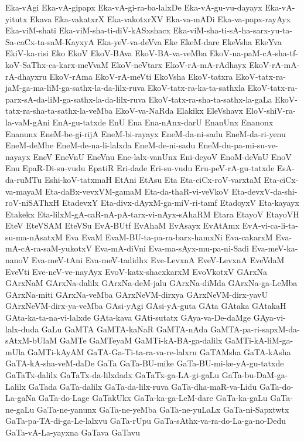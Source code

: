 {Eka-vAgi
Eka-vA-gipapx
Eka-vA-gi-ra-ba-lalxDe
Eka-vA-gu-vu-dayayx
Eka-vA-yitutx
Ekava
Eka-vakatxrX
Eka-vakotxrXV
Eka-va-mADi
Eka-va-papx-rayAyx
Eka-viM-shati
Eka-viM-sha-ti-diV-kASxshacx
Eka-viM-sha-ti-sA-ha-sarx-yu-ta-Sa-caCx-ta-saM-KayxyA
Eka-yeV-va-deVva
Eke
EkeM-dare
EkeVsha
EkeYva
EkiV-ka-risi
Eko
EkoV
EkoV-BAva
EkoV-BA-va-veMba
EkoV-na-paM-cA-sha-tf-koV-SaThx-ca-karx-meVvaM
EkoV-neVtarx
EkoV-rA-mA-rAdhayx
EkoV-rA-mA-rA-dhayxru
EkoV-rAma
EkoV-rA-meVti
EkoVsha
EkoV-tatxra
EkoV-tatx-ra-jaM-ga-ma-liM-ga-sathx-la-da-lilx-ruva
EkoV-tatx-ra-ka-ta-sathxla
EkoV-tatx-ra-parx-sA-da-liM-ga-sathx-la-da-lilx-ruva
EkoV-tatx-ra-sha-ta-sathx-la-gaLa
EkoV-tatx-ra-sha-ta-sathx-la-veMba
EkoV-va-NaRda
Elakikx
EleVshavx
EloV-shiV-ra-la-vaM-gAni
EnA-gu-tatxde
EnU
Ena
Ena-nAnx-darU
EnanUnx
Enanonx
Enanunx
EneM-be-gi-rijA
EneM-bi-rayayx
EneM-da-ni-sadu
EneM-da-ri-yenu
EneM-deMbe
EneM-de-na-li-lalxda
EneM-de-ni-sadu
EneM-du-pa-mi-su-ve-nayayx
EneV
EneVnU
EneVnu
Ene-lalx-vanUnx
Eni-deyoV
EnoM-deVnU
EnoV
Enu
EpaR-Di-su-vudu
EpatiR
Eri-dade
Eri-su-vudu
Eru-peV-rA-gu-tatxde
EsA-da-ruMTu
Eshi-koV-tatxmaH
EtAni
EtAsu
Eta
Eta-ciCx-roV-varxtaM
Eta-ciCx-va-mayaM
Eta-daBx-vevxVM-gamaM
Eta-da-thaR-vi-veVkoV
Eta-devxV-da-shi-roV-niSAThxH
EtadevxY
Eta-divx-dAyxM-ga-miV-ri-tamf
EtadoyxV
Eta-kayayx
Etakekx
Eta-lilxM-gA-caR-nA-pA-tarx-vi-nAyx-sAhaRM
Etara
EtayoV
EtayoVH
EteV
EteVSAM
EteVSu
EvA-BUtf
EvAhaM
EvAsayx
EvAtAmx
EvA-vi-ca-li-ta-su-ma-nAsatxM
Eva
EvaM
EvaM-BU-ta-pa-ra-barx-hamxNi
Eva-cakarxM
Eva-mA-cA-ra-saM-yukotxV
Eva-mA-diVni
Eva-ma-sAyx-mu-pa-ni-Sadi
Eva-meV-ka-nanoV
Eva-meV-tAni
Eva-meV-tadidhx
Eve-LevxnA
EveV-LevxnA
EveVdaM
EveVti
Eve-neV-ve-nayAyx
EvoV-katx-shacxkarxM
EvoVkotxV
GArxNa
GArxNaM
GArxNa-dalilx
GArxNa-deM-jalu
GArxNa-diMda
GArxNa-ga-LeMba
GArxNa-miti
GArxNa-veMba
GArxNeVM-dirxya
GArxNeVM-dirx-yavU
GArxNeVM-dirx-ya-veMba
GAsi-yAgi
GAsi-yA-guta
GAta
GAtaka
GAtakaH
GAta-ka-ta-na-vi-lalxde
GAta-kava
GAti-sutatx
GAya-va-De-daMge
GAya-vi-lalx-duda
GaLu
GaMTA
GaMTA-kaNaR
GaMTA-nAda
GaMTA-pa-ri-sapxM-da-sAtxM-bUlaM
GaMTe
GaMTeyaM
GaMTi-kA-BA-ga-dalilx
GaMTi-kA-liM-ga-mUla
GaMTi-kAyAM
GaTA-Ga-Ti-ta-ra-va-re-lalxru
GaTAMsha
GaTA-kAsha
GaTA-kA-sha-veM-daDe
GaTa
GaTa-BU-mike
GaTa-BU-mi-ke-yA-gu-tatxde
GaTaTx-dalilx
GaTaTx-da-lilxdadx
GaTaTx-ga-LA-gi-gaLu
GaTa-bu-DaM-ga-Lalilx
GaTada
GaTa-dalilx
GaTa-da-lilx-ruva
GaTa-dha-maR-va-Lidu
GaTa-do-La-gaNa
GaTa-do-Lage
GaTakUkx
GaTa-ka-ga-LeM-dare
GaTa-ka-gaLu
GaTa-ne-gaLu
GaTa-ne-yanunx
GaTa-ne-yeMba
GaTa-ne-yuLaLx
GaTa-ni-Sapxtwtx
GaTa-pa-TA-di-ga-Le-lalxvu
GaTa-rUpu
GaTa-sAthx-va-ra-do-La-ga-no-Dedu
GaTa-vA-La-yayxna
GaTava
GaTavu
}
